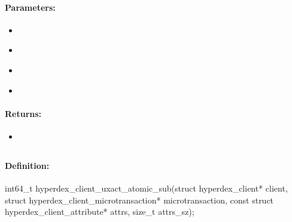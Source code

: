 \paragraph{Parameters:}
\begin{itemize}[noitemsep]
\item {}\\

\item {}\\

\item {}\\

\item {}\\

\end{itemize}

\paragraph{Returns:}
\begin{itemize}[noitemsep]
\item {}\\

\end{itemize}

\pagebreak
\subsection{}
\label{api:c:uxact_atomic_sub}


\paragraph{Definition:}
\begin{ccode}
int64_t hyperdex_client_uxact_atomic_sub(struct hyperdex_client* client,
        struct hyperdex_client_microtransaction* microtransaction,
        const struct hyperdex_client_attribute* attrs, size_t attrs_sz);
\end{ccode}

